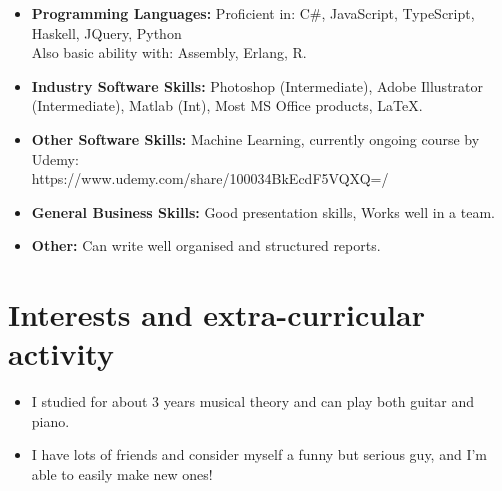 \documentclass[11pt,a4paper,sans]{moderncv}        %
\begin{document}
{\vspace{6pt}

\begin{itemize}

\item \textbf{Programming Languages:} Proficient in: C\#, JavaScript, TypeScript, Haskell, JQuery, Python \\ Also basic ability with: Assembly, Erlang, R.

\vspace{6pt}

\item \textbf{Industry Software Skills:} Photoshop (Intermediate), Adobe Illustrator (Intermediate), Matlab (Int), Most MS Office products, \LaTeX.

\vspace{6pt}

\item \textbf{Other Software Skills:} Machine Learning, currently ongoing course by Udemy: \\ https://www.udemy.com/share/100034BkEcdF5VQXQ=/

\vspace{6pt}

\item \textbf{General Business Skills:} Good presentation skills, Works well in a team.

\vspace{6pt}

\item \textbf{Other:} Can write well organised and structured reports.

\end{itemize}

\section{Interests and extra-curricular activity}

\vspace{6pt}

\begin{itemize}

\item{I studied for about 3 years musical theory and can play both guitar and piano.}

\vspace{6pt}

\item{I have lots of friends and consider myself a funny but serious guy, and I'm able to easily make new ones! }


\end{itemize}}
\end{document}

